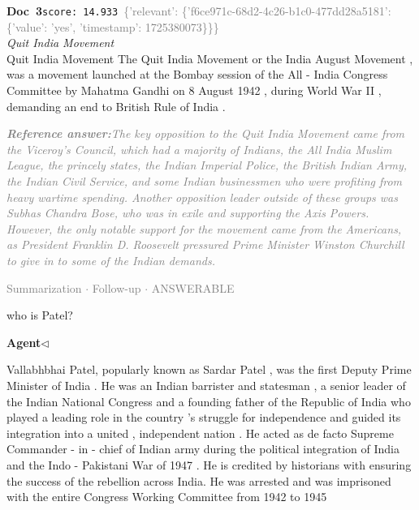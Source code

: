 \documentclass[a4paper,11pt]{article}
\begin{document}
\begin{docenv}
{\footnotesize\textcolor{doccolor}{\textbf{Doc~3}}}\hfill{\tiny\texttt{score:~14.933}}\ {\tiny\textcolor{gray}{\{'relevant': \{'f6ce971c-68d2-4c26-b1c0-477dd28a5181': \{'value': 'yes', 'timestamp': 1725380073\}\}\}}}\\[3pt]
{\small\textit{Quit India Movement}}\\[2pt]
\vspace{2pt}
{\footnotesize Quit India Movement
The Quit India Movement or the India August Movement , was a movement launched at the Bombay session of the All - India Congress Committee by Mahatma Gandhi on 8 August 1942 , during World War II , demanding an end to British Rule of India .}
\end{docenv}
\begin{refanswerenv}
{\footnotesize\textit{\textcolor{gray}{\textbf{Reference answer:}\enspace The key opposition to the Quit India Movement came from the Viceroy's Council, which had a majority of Indians, the All India Muslim League, the princely states, the Indian Imperial Police, the British Indian Army, the Indian Civil Service, and some Indian businessmen who were profiting from heavy wartime spending. Another opposition leader outside of these groups was Subhas Chandra Bose, who was in exile and supporting the Axis Powers. However, the only notable support for the movement came from the Americans, as President Franklin D. Roosevelt pressured Prime Minister Winston Churchill to give in to some of the Indian demands.}}}
\end{refanswerenv}
\vspace{0.5em}
\hfill{\tiny\textcolor{gray}{Summarization $\cdot$ Follow-up $\cdot$ ANSWERABLE}}
\begin{userbubble}
who is Patel?
\end{userbubble}
\noindent\hfill{\small\textcolor{agentcolor}{\textbf{Agent\enspace$\triangleleft$}}}
\begin{agentbubble}
Vallabhbhai Patel, popularly known as Sardar Patel , was the first Deputy Prime Minister of India . He was an Indian barrister and statesman , a senior leader of the Indian National Congress and a founding father of the Republic of India who played a leading role in the country 's struggle for independence and guided its integration into a united , independent nation . He acted as de facto Supreme Commander - in - chief of Indian army during the political integration of India and the Indo - Pakistani War of 1947 . He is credited by historians with ensuring the success of the rebellion across India. He was arrested and was imprisoned with the entire Congress Working Committee from 1942 to 1945 
\end{agentbubble}
\end{document}
